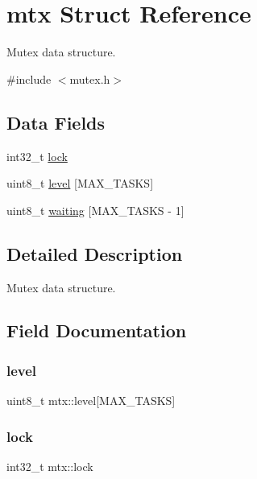 \hypertarget{structmtx}{}\section{mtx Struct Reference}
\label{structmtx}


Mutex data structure.  




{\ttfamily \#include $<$mutex.\+h$>$}

\subsection*{Data Fields}
\begin{DoxyCompactItemize}
\item 
int32\+\_\+t \hyperlink{structmtx_a5c9abfe5d985f974f920b19b94890f40}{lock}
\item 
uint8\+\_\+t \hyperlink{structmtx_ab13e9d09a96e18160571b960e4e7c1fb}{level} \mbox{[}M\+A\+X\+\_\+\+T\+A\+S\+KS\mbox{]}
\item 
uint8\+\_\+t \hyperlink{structmtx_a14e1d218cc3d0cd3e74ae6de1eb69212}{waiting} \mbox{[}M\+A\+X\+\_\+\+T\+A\+S\+KS -\/ 1\mbox{]}
\end{DoxyCompactItemize}


\subsection{Detailed Description}
Mutex data structure. 

\subsection{Field Documentation}
\mbox{\label{structmtx_ab13e9d09a96e18160571b960e4e7c1fb}} 
\subsubsection{\texorpdfstring{level}{level}}
{\footnotesize\ttfamily uint8\+\_\+t mtx\+::level\mbox{[}M\+A\+X\+\_\+\+T\+A\+S\+KS\mbox{]}}

\mbox{\label{structmtx_a5c9abfe5d985f974f920b19b94890f40}} 
\subsubsection{\texorpdfstring{lock}{lock}}
{\footnotesize\ttfamily int32\+\_\+t mtx\+::lock}

